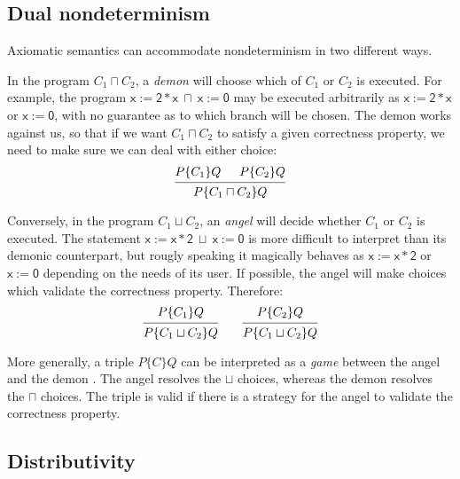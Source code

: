 \documentclass[11pt,oneside,draft]{book}
\theoremstyle{definition}
\newcommand{\kw}[1]{\ensuremath{ \mathsf{#1} }}
\newcommand{\htr}[3]{{ {#1} \lbrace {#2} \rbrace {#3} }}
\begin{document}

\subsection{Dual nondeterminism} %

Axiomatic semantics
can accommodate nondeterminism in two different ways.

In the program $C_1 \sqcap C_2$,
a \emph{demon} will choose which of $C_1$ or $C_2$ is executed.
For example,
the program $\kw{x := 2 * x} \: \sqcap \: \kw{x := 0}$
may be executed arbitrarily as $\kw{x := 2 * x}$ or $\kw{x := 0}$,
with no guarantee as to which branch will be chosen.
The demon works against us,
so that if we want $C_1 \sqcap C_2$ to satisfy
a given correctness property,
we need to make sure we can deal with either choice:
\[
  \begin{prooftree}
    \hypo{\htr{P}{C_1}{Q}}
    \hypo{\htr{P}{C_2}{Q}}
    \infer2{\htr{P}{C_1 \sqcap C_2}{Q}}
  \end{prooftree}
\]

Conversely,
in the program $C_1 \sqcup C_2$,
an \emph{angel} will decide whether $C_1$ or $C_2$ is executed.
The statement $\kw{x := x * 2} \: \sqcup \: \kw{x := 0}$
is more difficult to interpret than its demonic counterpart,
but rougly speaking it magically behaves as
$\kw{x := x * 2}$ or $\kw{x := 0}$
depending on the needs of its user.
If possible,
the angel will make choices which validate
the correctness property.
Therefore:
\[
  \begin{prooftree}
    \hypo{\htr{P}{C_1}{Q}}
    \infer1{\htr{P}{C_1 \sqcup C_2}{Q}}
  \end{prooftree}
  \qquad
  \begin{prooftree}
    \hypo{\htr{P}{C_2}{Q}}
    \infer1{\htr{P}{C_1 \sqcup C_2}{Q}}
  \end{prooftree}
\]

More generally,
a triple $\htr{P}{C}{Q}$
can be interpreted as a \emph{game}
between the angel and the demon \citep[Chapter 14]{refcal}.
The angel resolves the $\sqcup$ choices,
whereas the demon resolves the $\sqcap$ choices.
The triple is valid if there is a strategy
for the angel
to validate the correctness property.


\subsection{Distributivity} %
\end{document}

